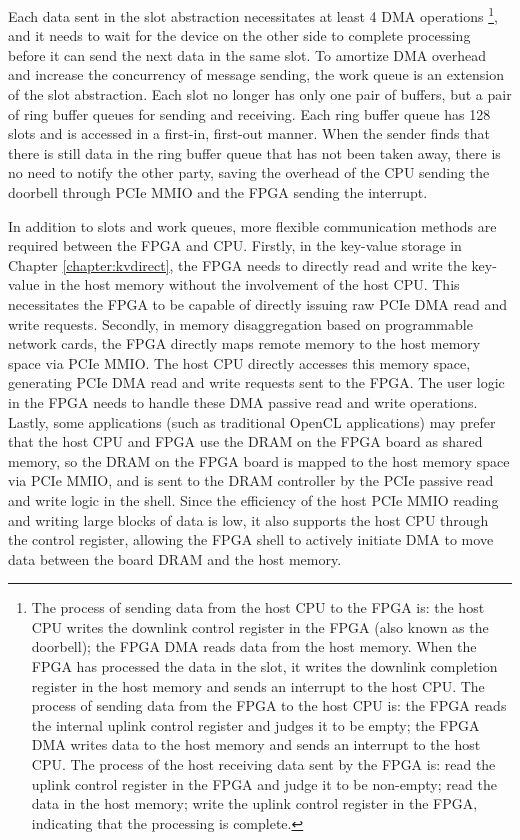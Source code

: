 Each data sent in the slot abstraction necessitates at least 4 DMA operations \footnote{The process of sending data from the host CPU to the FPGA is: the host CPU writes the downlink control register in the FPGA (also known as the doorbell); the FPGA DMA reads data from the host memory. When the FPGA has processed the data in the slot, it writes the downlink completion register in the host memory and sends an interrupt to the host CPU. The process of sending data from the FPGA to the host CPU is: the FPGA reads the internal uplink control register and judges it to be empty; the FPGA DMA writes data to the host memory and sends an interrupt to the host CPU. The process of the host receiving data sent by the FPGA is: read the uplink control register in the FPGA and judge it to be non-empty; read the data in the host memory; write the uplink control register in the FPGA, indicating that the processing is complete.}, and it needs to wait for the device on the other side to complete processing before it can send the next data in the same slot. To amortize DMA overhead and increase the concurrency of message sending, the work queue is an extension of the slot abstraction. Each slot no longer has only one pair of buffers, but a pair of ring buffer queues for sending and receiving. Each ring buffer queue has 128 slots and is accessed in a first-in, first-out manner. When the sender finds that there is still data in the ring buffer queue that has not been taken away, there is no need to notify the other party, saving the overhead of the CPU sending the doorbell through PCIe MMIO and the FPGA sending the interrupt.

In addition to slots and work queues, more flexible communication methods are required between the FPGA and CPU. Firstly, in the key-value storage in Chapter \ref{chapter:kvdirect}, the FPGA needs to directly read and write the key-value in the host memory without the involvement of the host CPU. This necessitates the FPGA to be capable of directly issuing raw PCIe DMA read and write requests. Secondly, in memory disaggregation based on programmable network cards, the FPGA directly maps remote memory to the host memory space via PCIe MMIO. The host CPU directly accesses this memory space, generating PCIe DMA read and write requests sent to the FPGA. The user logic in the FPGA needs to handle these DMA passive read and write operations. Lastly, some applications (such as traditional OpenCL applications) may prefer that the host CPU and FPGA use the DRAM on the FPGA board as shared memory, so the DRAM on the FPGA board is mapped to the host memory space via PCIe MMIO, and is sent to the DRAM controller by the PCIe passive read and write logic in the shell. Since the efficiency of the host PCIe MMIO reading and writing large blocks of data is low, it also supports the host CPU through the control register, allowing the FPGA shell to actively initiate DMA to move data between the board DRAM and the host memory.

